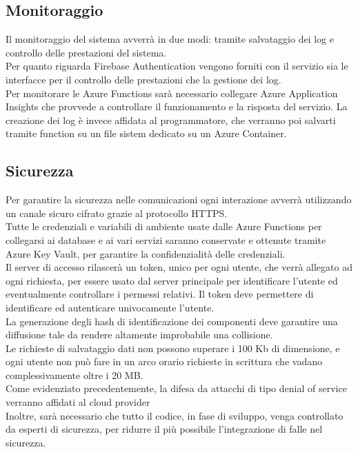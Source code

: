 \subsection{Monitoraggio}
Il monitoraggio del sistema avverrà in due modi: tramite salvataggio dei log e controllo delle prestazioni del sistema.\\
Per quanto riguarda Firebase Authentication vengono forniti con il servizio sia le interfacce per il controllo delle prestazioni che la gestione dei log.\\
Per monitorare le Azure Functions sarà necessario collegare Azure Application Insights che provvede a controllare il funzionamento e la risposta del servizio.
La creazione dei log è invece affidata al programmatore, che verranno poi salvarti tramite function su un file sistem dedicato su un Azure Container. 

\subsection{Sicurezza}
Per garantire la sicurezza nelle comunicazioni ogni interazione avverrà utilizzando un canale sicuro cifrato grazie al protocollo HTTPS.\\
Tutte le credenziali e variabili di ambiente usate dalle Azure Functions per collegarsi ai database 
e ai vari servizi saranno conservate e ottenute tramite Azure Key Vault, per garantire la confidenzialità delle credenziali.\\
Il server di accesso rilascerà un token, unico per ogni utente, che verrà allegato ad ogni richiesta, 
per essere usato dal server principale per identificare l'utente ed eventualmente controllare i permessi relativi.
Il token deve permettere di identificare ed autenticare univocamente l'utente.\\
La generazione degli hash di identificazione dei componenti deve garantire una diffusione tale da rendere altamente improbabile una collisione.\\
Le richieste di salvataggio dati non possono superare i 100 Kb di dimensione, 
e ogni utente non può fare in un arco orario richieste in scrittura che vadano complessivamente oltre i 20 MB.\\
Come evidenziato precedentemente, la difesa da attacchi di tipo denial of service verranno affidati al cloud provider\\
Inoltre, sarà necessario che tutto il codice, in fase di sviluppo, venga controllato da esperti di sicurezza, 
per ridurre il più possibile l'integrazione di falle nel sicurezza.\\ 

